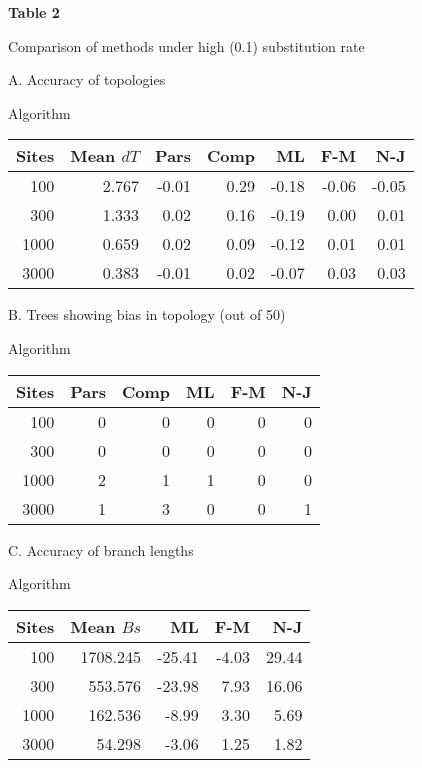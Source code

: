 \begin{flushleft}
{\bf Table 2

Comparison of methods under high (0.1) substitution rate}

\begin{center}
A.  Accuracy of topologies

Algorithm

\begin{tabular}{| r | r | r r r r r |}
\hline
Sites & Mean $dT$ & Pars & Comp & ML & F-M & N-J \\
\hline
100 & 2.767 & -0.01 & 0.29 & -0.18 & -0.06 & -0.05\\
300 & 1.333 & 0.02 & 0.16 & -0.19 & 0.00 & 0.01\\
1000 & 0.659 & 0.02 & 0.09 & -0.12 & 0.01  & 0.01\\
3000 & 0.383 & -0.01 & 0.02 & -0.07 & 0.03  & 0.03\\
\hline
\end{tabular}
\bigskip

B. Trees showing bias in topology (out of 50)

Algorithm

\begin{tabular}{| r | r r r r r |}
\hline
Sites  & Pars & Comp & ML & F-M  & N-J\\
\hline
100  & 0 & 0 & 0 & 0 & 0\\
300  & 0 & 0 & 0 & 0 & 0\\
1000  & 2 & 1 & 1 & 0 & 0\\
3000  & 1 & 3 & 0 & 0 & 1\\
\hline
\end{tabular}
\end{center}

\newpage
{}

\bigskip
\begin{center}
C.  Accuracy of branch lengths

Algorithm

\begin{tabular}{| r | r | r r r |}
\hline
Sites & Mean $Bs$ & ML & F-M & N-J\\
\hline
100 & 1708.245 & -25.41 & -4.03 & 29.44 \\
300 & 553.576 & -23.98 & 7.93 & 16.06 \\
1000 & 162.536 & -8.99 & 3.30 & 5.69 \\
3000 & 54.298 & -3.06 & 1.25 & 1.82 \\
\hline
\end{tabular}


\end{center}
\end{flushleft}

